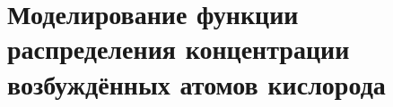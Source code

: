 \documentclass[12pt,a4paper]{article}
\begin{document}

\section{Моделирование функции распределения концентрации возбуждённых атомов кислорода} \label{sec:modelling}
 
\end{document}
